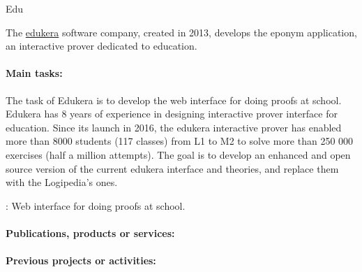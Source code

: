 \begin{sitedescription}{Edu}



The \hyperlink{https://www.edukera.com}{edukera} software company, created in 2013, develops the eponym application, an interactive prover dedicated to education.

\paragraph{Main tasks:}


The task of Edukera is to develop the web interface for doing proofs at school. Edukera
has 8 years of experience in designing interactive prover interface for education.
Since its launch in 2016, the edukera interactive prover has enabled more than 8000 students
(117 classes) from L1 to M2 to solve more than 250 000 exercises (half a million attempts).
The goal is to develop an enhanced and open source version of the current edukera interface
and theories, and replace them with the Logipedia's ones.


\begin{compactitem}
\item {}: Web interface for doing proofs at school.
\end{compactitem}

\paragraph{Publications, products or services:}


\begin{compactitem}
\item
\end{compactitem}

\paragraph{Previous projects or activities:}


\end{sitedescription}
